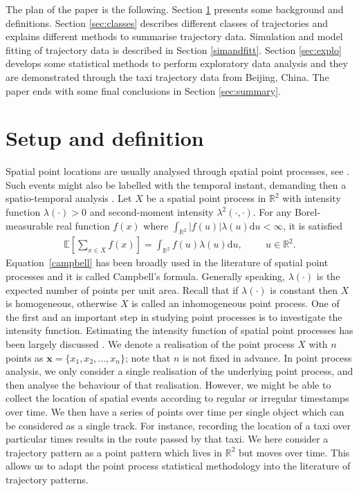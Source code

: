 \documentclass[article]{jss}
\newcommand{\R}{\mathbb{R}}
\newcommand{\ee}{\mathbb{E}}
\newcommand{\de}{\mathrm{d}}
\begin{document}
The plan of the paper is the following.
Section \ref{sec:setdef} presents some background and definitions.
Section \ref{sec:classes} describes different classes of trajectories and explains different methods to summarise trajectory data. Simulation and model fitting of trajectory data is described in Section \ref{simandfitt}. Section \ref{sec:explo} develops some statistical methods to perform exploratory data analysis and they are demonstrated through the taxi trajectory data from Beijing, China. The paper ends with some final conclusions in Section \ref{sec:summary}.

\section{Setup and definition}\label{sec:setdef}
Spatial point locations are usually analysed through spatial point processes, see \cite{MW03,daley07,BRT15}. Such events might also be labelled with the temporal instant, demanding then a spatio-temporal analysis \citep{D13}. Let $X$ be a spatial point process in $\mathbb{R}^2$ with intensity function $\lambda(\cdot) >0$ and second-moment intensity $\lambda^2(\cdot,\cdot)$. For any Borel-measurable real function $f(x)$ where $\int_{\R^2} |f(u)|\lambda(u) \de u < \infty$, it is satisfied
\begin{eqnarray}\label{campbell}
\ee \left[\sum\limits_{x \in X} f(x)\right]=\int_{\R^2} f(u)\lambda(u) \de u, \hspace{1cm} u \in \R^2.
\end{eqnarray}
Equation~\ref{campbell} has been broadly used in the literature of spatial point processes and it is called Campbell's formula. Generally speaking, $\lambda(\cdot) $ is the expected number of points per unit area. Recall that if $\lambda(\cdot)$ is constant then $X$ is homogeneous, otherwise $X$ is called an inhomogeneous point process. One of the first and an important step in studying point processes is to investigate the intensity function. Estimating the intensity function of spatial point processes has been largely discussed \citep{D85,jones93,CSKWM13}. We denote a realisation of the point process $X$ with $n$ points as $\mathbf{x}=\{x_1,x_2,\ldots,x_n \}$; note that $n$ is not fixed in advance. 
In point process analysis, we only consider a single realisation of the underlying point process, and then analyse the behaviour of that realisation. However, we might be able to collect the location of spatial events according to regular or irregular timestamps over time. We then have a series of points over time per single object which can be considered as a single track. For instance,  recording the location of a taxi over particular times results in the route passed by that taxi. We here consider a trajectory pattern as a point pattern which lives in $\R^2$ but moves over time. This allows us to adapt the point process statistical methodology into the literature of trajectory patterns.
\end{document}
